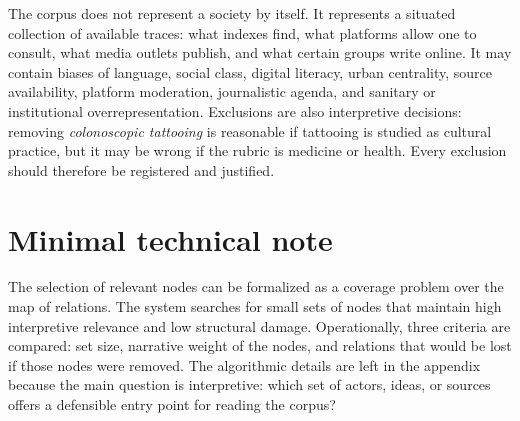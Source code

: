 \documentclass[11pt]{article}
\begin{document}
The corpus does not represent a society by itself. It represents a situated
collection of available traces: what indexes find, what platforms allow one to
consult, what media outlets publish, and what certain groups write online. It
may contain biases of language, social class, digital literacy, urban centrality,
source availability, platform moderation, journalistic agenda, and sanitary or
institutional overrepresentation. Exclusions are also interpretive decisions:
removing \textit{colonoscopic tattooing} is reasonable if tattooing is studied
as cultural practice, but it may be wrong if the rubric is medicine or health.
Every exclusion should therefore be registered and justified.

\appendix
\section{Minimal technical note}

The selection of relevant nodes can be formalized as a coverage problem over the
map of relations. The system searches for small sets of nodes that maintain high
interpretive relevance and low structural damage. Operationally, three criteria
are compared: set size, narrative weight of the nodes, and relations that would
be lost if those nodes were removed. The algorithmic details are left in the
appendix because the main question is interpretive: which set of actors, ideas,
or sources offers a defensible entry point for reading the corpus?


\end{document}
